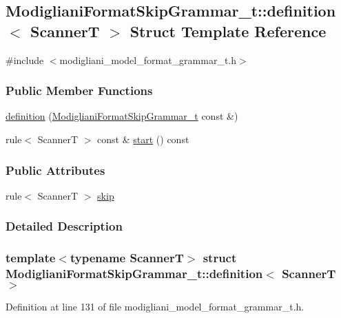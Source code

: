 \subsection{ModiglianiFormatSkipGrammar\_\-t::definition$<$ ScannerT $>$ Struct Template Reference}
\label{struct_modigliani_format_skip_grammar__t_1_1definition}


{\ttfamily \#include $<$modigliani\_\-model\_\-format\_\-grammar\_\-t.h$>$}

\subsubsection*{Public Member Functions}
\begin{DoxyCompactItemize}
\item 
\hyperlink{struct_modigliani_format_skip_grammar__t_1_1definition_a18c8dcf915be15f8b449cf669ae073e4}{definition} (\hyperlink{struct_modigliani_format_skip_grammar__t}{ModiglianiFormatSkipGrammar\_\-t} const \&)
\item 
rule$<$ ScannerT $>$ const \& \hyperlink{struct_modigliani_format_skip_grammar__t_1_1definition_a4070e3db492c516db54a41b0b35adbdb}{start} () const 
\end{DoxyCompactItemize}
\subsubsection*{Public Attributes}
\begin{DoxyCompactItemize}
\item 
rule$<$ ScannerT $>$ \hyperlink{struct_modigliani_format_skip_grammar__t_1_1definition_a905c59a2501ed57862160b13cbfd53cd}{skip}
\end{DoxyCompactItemize}


\subsubsection{Detailed Description}
\subsubsection*{template$<$typename ScannerT$>$ struct ModiglianiFormatSkipGrammar\_\-t::definition$<$ ScannerT $>$}



Definition at line 131 of file modigliani\_\-model\_\-format\_\-grammar\_\-t.h.



